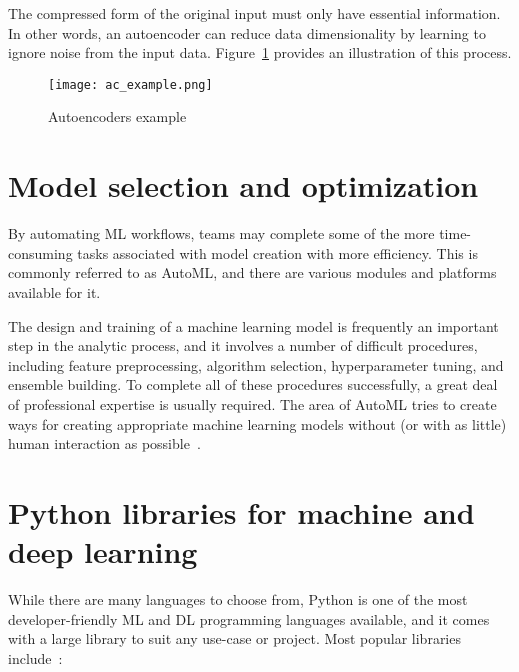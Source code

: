 The compressed form of the original input must only have essential information. In other words, an autoencoder can reduce data dimensionality by learning to ignore noise from the input data. Figure~\ref{fig:ac_example} provides an illustration of this process.

\begin{figure}[htbp]
    \centering
    \texttt{[image: ac\_example.png]}
    \caption{Autoencoders example~\cite{LopezPinaya2020Autoencoders}}
    \label{fig:ac_example}
\end{figure}

\section{Model selection and optimization}

By automating \gls{ML} workflows, teams may complete some of the more time-consuming tasks associated with model creation with more efficiency. This is commonly referred to as \gls{AutoML}, and there are various modules and platforms available for it.

The design and training of a machine learning model is frequently an important step in the analytic process, and it involves a number of difficult procedures, including feature preprocessing, algorithm selection, hyperparameter tuning, and ensemble building. To complete all of these procedures successfully, a great deal of professional expertise is usually required. The area of \gls{AutoML} tries to create ways for creating appropriate machine learning models without (or with as little) human interaction as possible~\cite{Tuggener2019AutomatedResults}.

\section{Python libraries for machine and deep learning}

While there are many languages to choose from, Python is one of the most developer-friendly \gls{ML} and \gls{DL} programming languages available, and it comes with a large library to suit any use-case or project. Most popular libraries include~\cite{JonssonWaysDevelopment,Paszke2019PyTorch:Library}:

